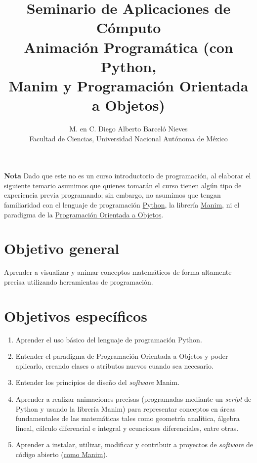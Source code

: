 \documentclass[a4paper]{article}
\begin{document}
\title{Seminario de Aplicaciones de Cómputo \\ Animación Programática (con Python, \\ Manim y Programación Orientada a Objetos) }
\author{M. en C. Diego Alberto Barceló Nieves \\ Facultad de Ciencias, Universidad Nacional Autónoma de México}
\date{}
\maketitle

\textbf{Nota} Dado que este no es un curso introductorio de programación, al elaborar el siguiente temario asumimos que quienes tomarán el curso tienen algún tipo de experiencia previa programando; sin embargo, no asumimos que tengan familiaridad con el lenguaje de programación \hyperlink{https://www.python.org/}{Python}, la librería \hyperlink{https://www.manim.community/}{Manim}, ni el paradigma de la \hyperlink{https://developer.mozilla.org/es/docs/Glossary/OOP}{Programación Orientada a Objetos}.

\section*{Objetivo general} \label{Sec: Objetivo general}

Aprender a visualizar y animar conceptos matemáticos de forma altamente precisa utilizando herramientas de programación.

\section*{Objetivos específicos} \label{Sec: Objetivos específicos}

\begin{enumerate}

    \item Aprender el uso básico del lenguaje de programación Python.

    \item Entender el paradigma de Programación Orientada a Objetos y poder aplicarlo, creando clases o atributos nuevos cuando sea necesario.

    \item Entender los principios de diseño del \emph{software} Manim.

    \item Aprender a realizar animaciones precisas (programadas mediante un \emph{script} de Python y usando la librería Manim) para representar conceptos en áreas fundamentales de las matemáticas tales como geometría analítica, álgebra lineal, cálculo diferencial e integral y ecuaciones diferenciales, entre otras.

    \item Aprender a instalar, utilizar, modificar y contribuir a proyectos de \emph{software} de código abierto (\hyperlink{https://github.com/ManimCommunity/manim}{como Manim}).
\end{enumerate}
\end{document}
